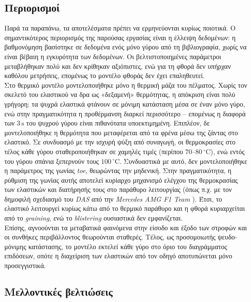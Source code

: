 \subsection{Περιορισμοί}

Παρά τα παραπάνω, τα αποτελέσματα πρέπει να ερμηνεύονται κυρίως ποιοτικά. Ο σημαντικότερος περιορισμός της παρούσας εργασίας
είναι η έλλειψη δεδομένων: η βαθμονόμηση βασίστηκε σε δεδομένα ενός μόνο γύρου από τη βιβλιογραφία,
χωρίς να είναι βέβαιη η εγκυρότητα των δεδομένων. Οι
βελτιστοποιημένες παράμετροι μεταβλήθηκαν πολύ και δεν κρίθηκαν αξιόπιστες, ενώ για τη φθορά δεν υπήρχαν
καθόλου μετρήσεις, επομένως το μοντέλο φθοράς δεν έχει επαληθευτεί.\\[8pt]
Στο θερμικό μοντέλο μοντελοποιήθηκε μόνο η θερμική μάζα του πέλματος. Χωρίς τον σκελετό του ελαστικού να
δρα ως «δεξαμενή» θερμότητας, η απόκριση είναι πολύ γρήγορη: τα ψυχρά ελαστικά φτάνουν σε μόνιμη
κατάσταση μέσα σε έναν μόνο γύρο, ενώ στην πραγματικότητα η προθέρμανση διαρκεί περισσότερο -- επομένως
η διαφορά των $3\,\mathrm{s}$ του ψυχρού γύρου είναι πιθανότατα υποεκτιμημένη. Επιπλέον, δε μοντελοποιήθηκε
η θερμότητα που μεταφέρεται από τα φρένα μέσω της ζάντας στο ελαστικό. Σε συνδυασμό με την ισχυρή ψύξη
από συναγωγή, οι θερμοκρασίες στο τέλος κάθε γύρου σταθεροποιήθηκαν σε χαμηλές τιμές (περίπου
$70$--$80\,^\circ\mathrm{C}$), ενώ εντός του γύρου σπάνια ξεπερνούν τους $100\,^\circ\mathrm{C}$. Συνδυαστικά με αυτό, δεν μοντελοποιήθηκε η παράμετρος της γωνίας \textit{toe}, θεωρώντας την μηδενική. Στην πραγματικότητα, η ρύθμιση της γωνίας αυτής αποτελεί κυρίαρχο μηχανισμό ελέγχου της θερμοκρασίας των ελαστικών και διατήρησής τους στο παράθυρο λειτουργίας (όπως π.χ. με τον δημοφιλή σχεδιασμό του \textit{DAS} από την \textit{Mercedes AMG F1 Team} \cite{WikipediaDualAxisSteering}).
Έτσι, το
ελαστικό λειτουργεί κυρίως κάτω από το θερμικό παράθυρο και η φθορά κυριαρχείται από το \textit{graining},
ενώ το \textit{blistering} ουσιαστικά δεν εμφανίζεται.\\[8pt]
Επίσης, αγνοούνται τα μεταβατικά
φαινόμενα στην είσοδο και έξοδο των στροφών και οι συνθήκες περιβάλλοντος θεωρούνται σταθερές. Τέλος, ως
προσομοιωτής ψευδο-μόνιμης κατάστασης, το μοντέλο εκτελεί κάθε γύρο στο όριο του διαγράμματος επιδόσεων,
οπότε η διαχείριση των ελαστικών από τον οδηγό αποτυπώνεται μόνο προσεγγιστικά.

\subsection{Μελλοντικές βελτιώσεις}

